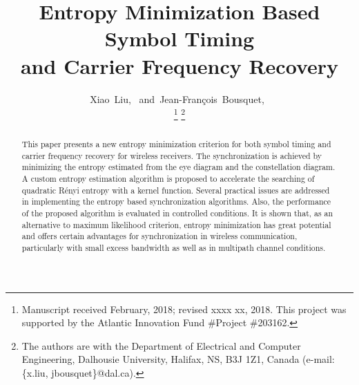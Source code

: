 \documentclass[12pt, draftclsnofoot, onecolumn]{IEEEtran}
\begin{document}
%

\title{Entropy Minimization Based Symbol Timing
\\and Carrier Frequency Recovery}
\author{Xiao~Liu,~
        and~Jean-Fran\c{c}ois~Bousquet,~%

\thanks{Manuscript received February, 2018; revised xxxx xx, 2018. This project was supported by the Atlantic Innovation Fund \#Project \#203162.}
\thanks{The authors are with the Department of Electrical and Computer Engineering, Dalhousie University, Halifax,
NS, B3J 1Z1, Canada (e-mail: \{x.liu, jbousquet\}@dal.ca).}%
}


\maketitle


\begin{abstract}
This paper presents a new entropy minimization criterion for both symbol timing and carrier frequency recovery for  wireless receivers.
The synchronization is achieved by minimizing the entropy estimated from the eye diagram and the constellation diagram. 
A custom entropy estimation algorithm is proposed to accelerate the searching of quadratic R\'enyi entropy with a kernel function.
Several practical issues are addressed in implementing the entropy based synchronization algorithms.
Also, the performance of the proposed algorithm is evaluated in controlled conditions.
It is shown that, as an alternative to maximum likelihood criterion, entropy minimization has great potential and offers certain advantages for synchronization in wireless communication, particularly with small excess bandwidth as well as in multipath channel conditions. 

\end{abstract}
\end{document}
